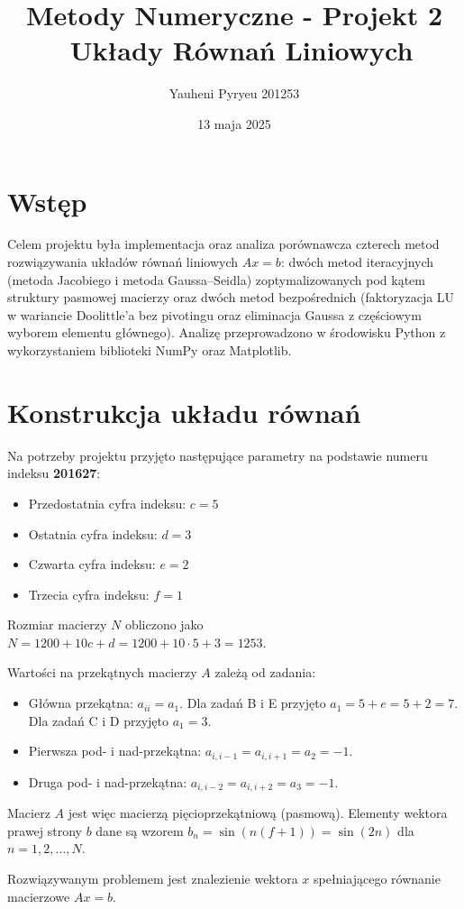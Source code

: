 \documentclass[a4paper, 11pt]{article}
\title{Metody Numeryczne - Projekt 2 \ Układy Równań Liniowych}
\author{Yauheni Pyryeu 201253}
\date{13 maja 2025}
\begin{document}
\maketitle

\section{Wstęp}
Celem projektu była implementacja oraz analiza porównawcza czterech metod rozwiązywania układów równań liniowych $Ax = b$: dwóch metod iteracyjnych (metoda Jacobiego i metoda Gaussa–Seidla) zoptymalizowanych pod kątem struktury pasmowej macierzy oraz dwóch metod bezpośrednich (faktoryzacja LU w wariancie Doolittle'a bez pivotingu oraz eliminacja Gaussa z częściowym wyborem elementu głównego). Analizę przeprowadzono w środowisku Python z wykorzystaniem biblioteki NumPy oraz Matplotlib.

\section{Konstrukcja układu równań}
Na potrzeby projektu przyjęto następujące parametry na podstawie numeru indeksu \textbf{201627}:
\begin{itemize}
    \item Przedostatnia cyfra indeksu: $c = 5$
    \item Ostatnia cyfra indeksu: $d = 3$
    \item Czwarta cyfra indeksu: $e = 2$
    \item Trzecia cyfra indeksu: $f = 1$
\end{itemize}
Rozmiar macierzy $N$ obliczono jako $N = 1200 + 10c + d = 1200 + 10 \cdot 5 + 3 = 1253$.

Wartości na przekątnych macierzy $A$ zależą od zadania:
\begin{itemize}
    \item Główna przekątna: $a_{ii} = a_1$. Dla zadań B i E przyjęto $a_1 = 5 + e = 5 + 2 = 7$. Dla zadań C i D przyjęto $a_1 = 3$.
    \item Pierwsza pod- i nad-przekątna: $a_{i, i-1} = a_{i, i+1} = a_2 = -1$.
    \item Druga pod- i nad-przekątna: $a_{i, i-2} = a_{i, i+2} = a_3 = -1$.
\end{itemize}
Macierz $A$ jest więc macierzą pięcioprzekątniową (pasmową). Elementy wektora prawej strony $b$ dane są wzorem $b_n = \sin(n(f+1)) = \sin(2n)$ dla $n = 1, 2, \dots, N$.

Rozwiązywanym problemem jest znalezienie wektora $x$ spełniającego równanie macierzowe $Ax = b$.
\end{document}
